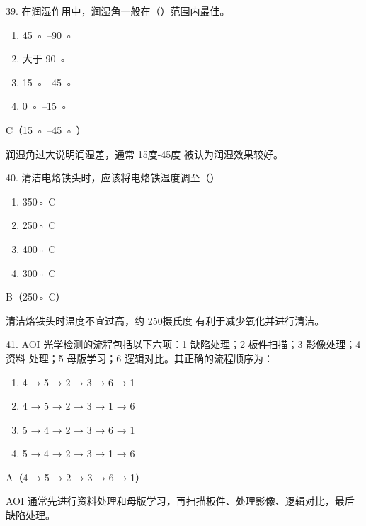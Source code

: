 \begin{question}{39. 在润湿作用中，润湿角一般在（）范围内最佳。}
\begin{enumerate}[label=\Alph*., leftmargin=2.4em, itemsep=0.2em]
\item 45 ◦ –90 ◦
\item 大于 90 ◦
\item 15 ◦ –45 ◦
\item 0 ◦ –15 ◦
\end{enumerate}
\end{question}
\begin{answer}
C（15 ◦ –45 ◦ ）
\end{answer}
\begin{explanation}
润湿角过大说明润湿差，通常 15度-45度 被认为润湿效果较好。
\end{explanation}

\begin{question}{40. 清洁电烙铁头时，应该将电烙铁温度调至（）}
\begin{enumerate}[label=\Alph*., leftmargin=2.4em, itemsep=0.2em]
\item 350◦ C
\item 250◦ C
\item 400◦ C
\item 300◦ C
\end{enumerate}
\end{question}
\begin{answer}
B（250◦ C）
\end{answer}
\begin{explanation}
清洁烙铁头时温度不宜过高，约 250摄氏度 有利于减少氧化并进行清洁。
\end{explanation}

\begin{question}{41. AOI 光学检测的流程包括以下六项：1 缺陷处理；2 板件扫描；3 影像处理；4 资料 处理；5 母版学习；6 逻辑对比。其正确的流程顺序为：}
\begin{enumerate}[label=\Alph*., leftmargin=2.4em, itemsep=0.2em]
\item 4 → 5 → 2 → 3 → 6 → 1
\item 4 → 5 → 2 → 3 → 1 → 6
\item 5 → 4 → 2 → 3 → 6 → 1
\item 5 → 4 → 2 → 3 → 1 → 6
\end{enumerate}
\end{question}
\begin{answer}
A（4 → 5 → 2 → 3 → 6 → 1）
\end{answer}
\begin{explanation}
AOI 通常先进行资料处理和母版学习，再扫描板件、处理影像、逻辑对比，最后缺陷处理。
\end{explanation}

